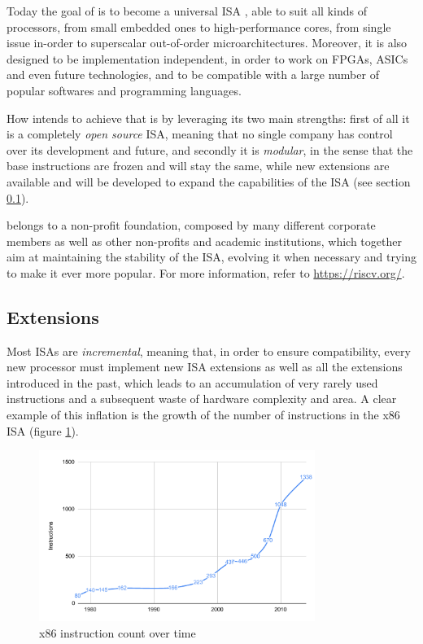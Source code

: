 Today the goal of \riscv is to become a universal \ac{ISA} \cite{reader}, able to suit all kinds of processors, from small embedded ones to high-performance cores, from single issue in-order to superscalar out-of-order microarchitectures. Moreover, it is also designed to be implementation independent, in order to work on \acsp{FPGA}, \acsp{ASIC} and even future technologies, and to be compatible with a large number of popular softwares and programming languages.

How \riscv intends to achieve that is by leveraging its two main strengths: first of all it is a completely \emph{open source} \ac{ISA}, meaning that no single company has control over its development and future, and secondly it is \emph{modular}, in the sense that the base instructions are frozen and will stay the same, while new extensions are available and will be developed to expand the capabilities of the ISA (see section \ref{sec:extensions}).

\riscv belongs to a non-profit foundation, composed by many different corporate members as well as other non-profits and academic institutions, which together aim at maintaining the stability of the \ac{ISA}, evolving it when necessary and trying to make it ever more popular. For more information, refer to \url{https://riscv.org/}.

\subsection{Extensions}\label{sec:extensions}
Most \acp{ISA} are \emph{incremental}, meaning that, in order to ensure compatibility, every new processor must implement new \ac{ISA} extensions as well as all the extensions introduced in the past, which leads to an accumulation of very rarely used instructions and a subsequent waste of hardware complexity and area. A clear example of this inflation is the growth of the number of instructions in the x86 \ac{ISA} (figure \ref{fig:x86}).
  
\begin{figure}[hbtp]
  \centering
  \includegraphics[width=0.8\textwidth]{img/x86.pdf}
  \caption[x86 instruction count over time]{x86 instruction count over time\footnotemark}
  \label{fig:x86}
\end{figure}


